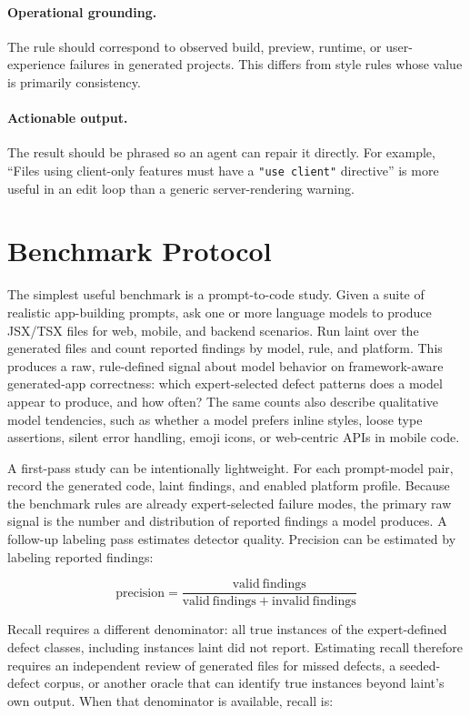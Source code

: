 \documentclass[11pt]{article}
\begin{document}
\paragraph{Operational grounding.}
The rule should correspond to observed build, preview, runtime, or user-experience failures in generated projects. This differs from style rules whose value is primarily consistency.

\paragraph{Actionable output.}
The result should be phrased so an agent can repair it directly. For example, ``Files using client-only features must have a \texttt{"use client"} directive'' is more useful in an edit loop than a generic server-rendering warning.

\section{Benchmark Protocol}

The simplest useful benchmark is a prompt-to-code study. Given a suite of realistic app-building prompts, ask one or more language models to produce JSX/TSX files for web, mobile, and backend scenarios. Run laint over the generated files and count reported findings by model, rule, and platform. This produces a raw, rule-defined signal about model behavior on framework-aware generated-app correctness: which expert-selected defect patterns does a model appear to produce, and how often? The same counts also describe qualitative model tendencies, such as whether a model prefers inline styles, loose type assertions, silent error handling, emoji icons, or web-centric APIs in mobile code.

A first-pass study can be intentionally lightweight. For each prompt-model pair, record the generated code, laint findings, and enabled platform profile. Because the benchmark rules are already expert-selected failure modes, the primary raw signal is the number and distribution of reported findings a model produces. A follow-up labeling pass estimates detector quality. Precision can be estimated by labeling reported findings:

\[
\mathrm{precision} = \frac{\mathrm{valid\ findings}}{\mathrm{valid\ findings} + \mathrm{invalid\ findings}}
\]

Recall requires a different denominator: all true instances of the expert-defined defect classes, including instances laint did not report. Estimating recall therefore requires an independent review of generated files for missed defects, a seeded-defect corpus, or another oracle that can identify true instances beyond laint's own output. When that denominator is available, recall is:
\end{document}
